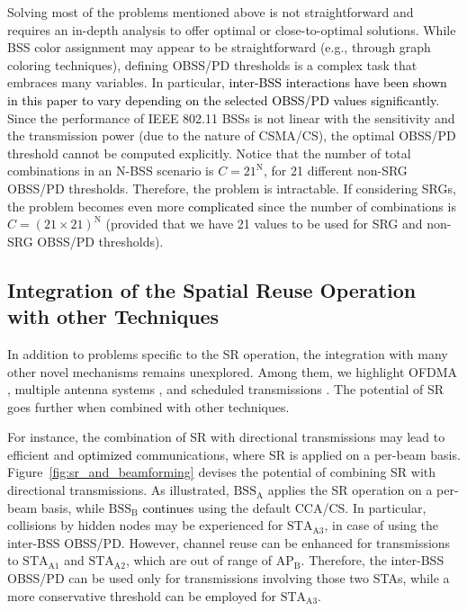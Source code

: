 \documentclass[preprint,12pt]{elsarticle}
\theoremstyle{plain}
\begin{document}
Solving most of the problems mentioned above is not straightforward and requires an in-depth analysis to offer optimal or close-to-optimal solutions. While BSS color assignment may appear to be straightforward (e.g., through graph coloring techniques), defining OBSS/PD thresholds is a complex task that embraces many variables. In particular, \textcolor{black}{inter-BSS interactions have been shown in this paper to vary depending on the selected OBSS/PD values significantly}. Since the performance of IEEE 802.11 BSSs is not linear with the sensitivity and the transmission power (due to the nature of CSMA/CS), the optimal OBSS/PD threshold cannot be computed explicitly. Notice that the number of total combinations in an N-BSS scenario is $C = 21^\text{N}$, for 21 different non-SRG OBSS/PD thresholds. Therefore, the problem is intractable. If considering SRGs, the problem becomes even more \textcolor{black}{complicated} since the number of combinations is $C = (21\times21)^\text{N}$ (provided that we have 21 values to be used for SRG and non-SRG OBSS/PD thresholds).

\subsection{Integration of the Spatial Reuse Operation with other Techniques}

In addition to problems specific to the SR operation, the integration with many other novel mechanisms remains unexplored. Among them, we highlight OFDMA \cite{bankov2018ofdma, dovelos2018optimal}, multiple antenna systems \cite{liao2016mu}, and scheduled transmissions \cite{nurchis2019target}. The potential of SR goes further when combined with other techniques. 

For instance, the combination of SR with directional transmissions may lead to efficient and \textcolor{black}{optimized} communications, where SR is applied on a per-beam basis. Figure~\ref{fig:sr_and_beamforming} devises the potential of combining SR with directional transmissions. As illustrated, $\text{BSS}_\text{A}$ applies the SR operation on a per-beam basis, while $\text{BSS}_\text{B}$ \textcolor{black}{continues} using the default CCA/CS. In particular, collisions by hidden nodes may be experienced for $\text{STA}_\text{A3}$, in case of using the inter-BSS OBSS/PD. However, channel reuse can be enhanced for transmissions to $\text{STA}_\text{A1}$ and $\text{STA}_\text{A2}$, which are out of range of $\text{AP}_\text{B}$. Therefore, the inter-BSS OBSS/PD can be used only for transmissions involving those two STAs, while a more conservative threshold can be employed for $\text{STA}_\text{A3}$.
\end{document}
